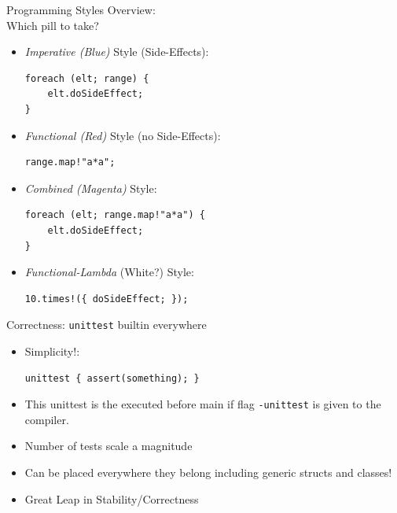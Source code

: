 \documentclass[xcolor=dvipsnames]{beamer}
\begin{document}
\begin{frame}[fragile]{Programming Styles Overview:\\Which pill to take?}
  \begin{itemize}[<+->]
  \item \emph{Imperative (Blue)} Style (Side-Effects):\\

    \begin{lstlisting}[frame=single]
foreach (elt; range) {
    elt.doSideEffect;
}
    \end{lstlisting}

  \item \emph{Functional (Red)} Style (no Side-Effects):\\
    \begin{lstlisting}[frame=single]
range.map!"a*a";
    \end{lstlisting}

  \item \emph{Combined (Magenta)} Style:\\
  \begin{lstlisting}[frame=single]
foreach (elt; range.map!"a*a") {
    elt.doSideEffect;
}
  \end{lstlisting}

  \item \emph{Functional-Lambda} (White?) Style:\\
  \begin{lstlisting}[frame=single]
10.times!({ doSideEffect; });
  \end{lstlisting}

  \end{itemize}
\end{frame}

\begin{frame}[fragile]{Correctness: \texttt{unittest} builtin everywhere}
  \begin{itemize}[<+->]
  \item Simplicity!:
  \begin{lstlisting}[frame=single]
unittest { assert(something); }
  \end{lstlisting}
  \item This unittest is the executed before main if flag \texttt{-unittest} is
  given to the compiler.
  \item Number of tests scale a magnitude
  \item Can be placed everywhere they belong including generic structs and
    classes!
  \item Great Leap in Stability/Correctness
  \end{itemize}
\end{frame}
\end{document}
